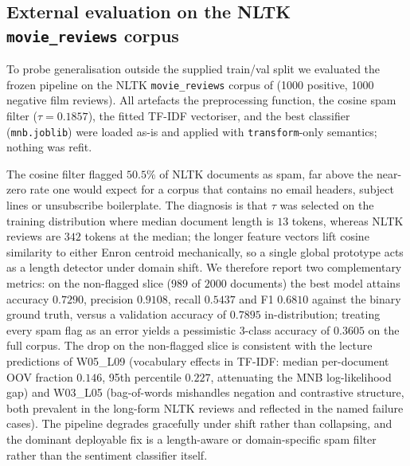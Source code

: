 \subsection{External evaluation on the NLTK \texttt{movie\_reviews} corpus}

To probe generalisation outside the supplied train/val split we evaluated the
frozen pipeline on the NLTK \texttt{movie\_reviews} corpus of
\citet{pang2004sentimental} (1000 positive, 1000 negative film reviews).
All artefacts \textemdash{} the preprocessing function, the cosine spam filter
($\tau = 0.1857$), the fitted TF-IDF vectoriser, and the best classifier
(\texttt{mnb.joblib}) \textemdash{} were loaded as-is and applied with
\texttt{transform}-only semantics; nothing was refit.

The cosine filter flagged $50.5\%$ of NLTK documents as spam,
far above the near-zero rate one would expect for a corpus that contains no
email headers, subject lines or unsubscribe boilerplate. The diagnosis is
that $\tau$ was selected on the training distribution where median document
length is $13$ tokens, whereas NLTK reviews are
$342$ tokens at the median; the longer feature
vectors lift cosine similarity to either Enron centroid mechanically, so a
single global prototype acts as a length detector under domain shift. We
therefore report two complementary metrics: on the non-flagged slice
($989$ of $2000$ documents) the best model attains
accuracy $0.7290$, precision $0.9108$, recall $0.5437$ and
F1 $0.6810$ against the binary ground truth, versus a validation accuracy
of $0.7895$ in-distribution; treating every spam flag as an error
yields a pessimistic 3-class accuracy of $0.3605$ on the full corpus.
The drop on the non-flagged slice is consistent with the lecture predictions
of W05\_L09 (vocabulary effects in TF-IDF: median per-document OOV fraction
$0.146$, 95th percentile $0.227$,
attenuating the MNB log-likelihood gap) and W03\_L05 (bag-of-words mishandles
negation and contrastive structure, both prevalent in the long-form NLTK
reviews and reflected in the named failure cases). The pipeline degrades
gracefully under shift rather than collapsing, and the dominant deployable
fix is a length-aware or domain-specific spam filter rather than the
sentiment classifier itself.
